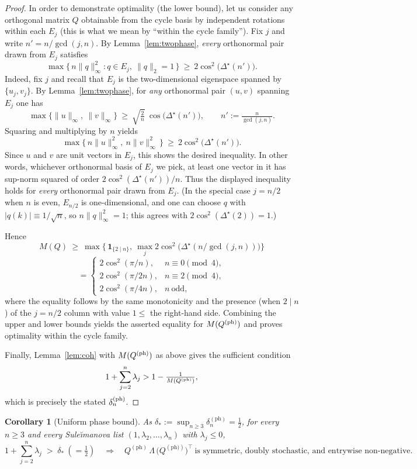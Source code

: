 \documentclass[12pt,fleqn]{amsart}
\renewcommand{\le}{\leqslant}
\renewcommand{\ge}{\geqslant}
\newtheorem{cor}[thm]{Corollary}
\theoremstyle{remark}
\newcommand{\1}{\mathbf{1}}
\begin{document}
\begin{proof}
In order to demonstrate optimality (the lower bound), let us consider any orthogonal matrix $Q$ obtainable from the cycle basis by independent rotations within each $E_j$ (this is what we mean by “within the cycle family”). Fix $j$ and write $n'=n/\gcd(j,n)$. By Lemma~\ref{lem:twophase}, \emph{every} orthonormal pair drawn from $E_j$ satisfies
\[
\max\{\,n\|q\|_\infty^2 : q\in E_j,\ \|q\|_2=1\,\}\ \ge\ 2\cos^2\!\big(\Delta^\star(n')\big).
\]
Indeed, fix $j$ and recall that $E_j$ is the two-dimensional eigenspace
spanned by $\{u_j,v_j\}$. By Lemma~\ref{lem:twophase}, for \emph{any}
orthonormal pair $(u,v)$ spanning $E_j$ one has
\[
\max\{\|u\|_\infty,\ \|v\|_\infty\}\ \ge\ 
\sqrt{\tfrac{2}{n}}\ \cos\!\bigl(\Delta^\star(n')\bigr),
\qquad n':=\tfrac{n}{\gcd(j,n)}.
\]
Squaring and multiplying by $n$ yields
\[
\max\{\,n\|u\|_\infty^2,\ n\|v\|_\infty^2\,\}\ \ge\
2\cos^2\!\bigl(\Delta^\star(n')\bigr).
\]
Since $u$ and $v$ are unit vectors in $E_j$, this shows the desired inequality. 
In other words, whichever orthonormal basis of $E_j$ we pick, at least
one vector in it has sup-norm squared of order $2\cos^2(\Delta^\star(n'))/n$.
Thus the displayed inequality holds for \emph{every} orthonormal pair
drawn from $E_j$. (In the special case $j=n/2$ when $n$ is even, $E_{n/2}$
is one-dimensional, and one can choose $q$ with $|q(k)|\equiv 1/\sqrt{n}$,
so $n\|q\|_\infty^2=1$; this agrees with
$2\cos^2(\Delta^\star(2))=1$.)

Hence
\[
M(Q)\ \ge\ \max\Big\{\,\mathbf{1}_{\{2\mid n\}},\ \max_{j}2\cos^2\!\big(\Delta^\star(n/\gcd(j,n))\big)\Big\}
\]
\[
=\begin{cases}
2\cos^2(\pi/n), & n\equiv 0\pmod 4,\\
2\cos^2(\pi/2n), & n\equiv 2\pmod 4,\\
2\cos^2(\pi/4n), & n\ \text{odd},
\end{cases}
\]
where the equality follows by the same monotonicity and the presence (when $2\mid n$) of the $j=n/2$ column with value $1\le$ the right-hand side. Combining the upper and lower bounds yields the asserted equality for $M(Q^{\rm (ph)})$ and proves optimality within the cycle family.

Finally, Lemma~\ref{lem:coh} with $M(Q^{\rm (ph)})$ as above gives the sufficient condition
\[
1+\sum_{j=2}^n\lambda_j>1-\tfrac{1}{M(Q^{\rm (ph)})},
\]
which is precisely the stated $\delta^{\rm (ph)}_n$.
\end{proof}

\begin{cor}[Uniform phase bound]\label{cor:uniform}
As $\delta_\ast:=\sup_{n\ge3}\delta^{\mathrm{(ph)}}_n=\tfrac12$, for every $n\ge3$ and every Sule\u{\i}manova list $(1,\lambda_2,\ldots,\lambda_n)$ with $\lambda_j\le0$,
\[
1+\sum_{j=2}^{n}\lambda_j \;>\; \delta_\ast\ (= \tfrac12)
\quad\Longrightarrow\quad
Q^{(\mathrm{ph})}\,\Lambda\,\big(Q^{(\mathrm{ph)})}\big)^{\!\top}\ \text{is symmetric, doubly stochastic, and entrywise non-negative}.
\]
\end{cor}
\end{document}
